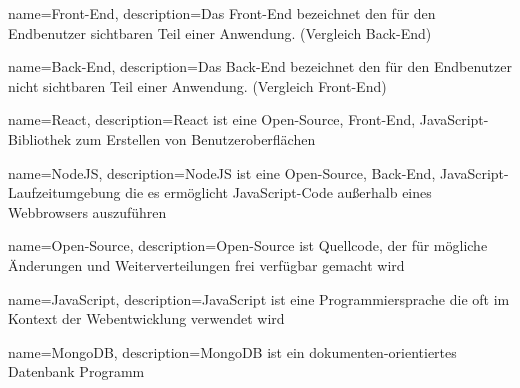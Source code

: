 {   name={Front-End},
    description={Das Front-End bezeichnet den für den Endbenutzer sichtbaren Teil einer Anwendung. (Vergleich \gls{Back-End})}
}

{   name={Back-End},
    description={Das Back-End bezeichnet den für den Endbenutzer nicht sichtbaren Teil einer Anwendung. (Vergleich \gls{Front-End})}
}

{   name={React},
    description={React ist eine \gls{Open-Source}, \gls{Front-End}, \gls{JavaScript}-Bibliothek zum Erstellen von Benutzeroberflächen}
}

{   name={NodeJS},
    description={NodeJS ist eine \gls{Open-Source}, \gls{Back-End}, \gls{JavaScript}-Laufzeitumgebung die es ermöglicht \gls{JavaScript}-Code außerhalb eines Webbrowsers auszuführen}
}

{   name={Open-Source},
    description={Open-Source ist Quellcode, der für mögliche Änderungen und Weiterverteilungen frei verfügbar gemacht wird}
}

{   name={JavaScript},
    description={JavaScript ist eine Programmiersprache die oft im Kontext der Webentwicklung verwendet wird}
}

{   name={MongoDB},
    description={MongoDB ist ein dokumenten-orientiertes Datenbank Programm}
}
